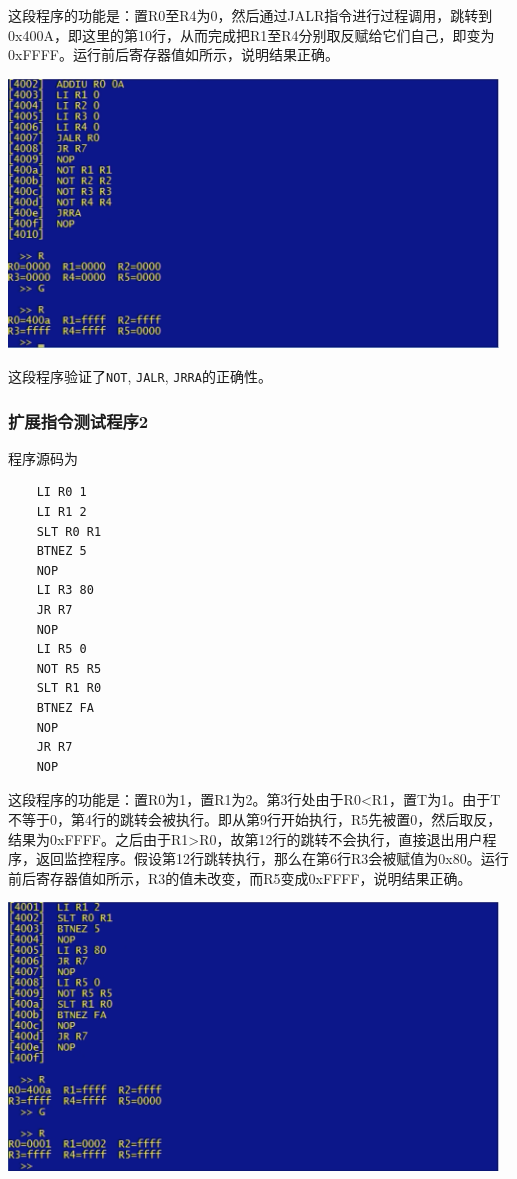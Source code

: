 这段程序的功能是：置R0至R4为0，然后通过JALR指令进行过程调用，跳转到0x400A，即这里的第10行，从而完成把R1至R4分别取反赋给它们自己，即变为0xFFFF。运行前后寄存器值如所示，说明结果正确。

\begin{center}
    \includegraphics[width=13cm]{image/testing/p1}
    \label{fig:testp1}
\end{center}

这段程序验证了\texttt{NOT}, \texttt{JALR}, \texttt{JRRA}的正确性。

\subsubsection{扩展指令测试程序2}

程序源码为

\begin{lstlisting}
    LI R0 1
    LI R1 2
    SLT R0 R1
    BTNEZ 5
    NOP
    LI R3 80
    JR R7
    NOP
    LI R5 0
    NOT R5 R5
    SLT R1 R0
    BTNEZ FA
    NOP
    JR R7
    NOP
\end{lstlisting}

这段程序的功能是：置R0为1，置R1为2。第3行处由于R0<R1，置T为1。由于T不等于0，第4行的跳转会被执行。即从第9行开始执行，R5先被置0，然后取反，结果为0xFFFF。之后由于R1>R0，故第12行的跳转不会执行，直接退出用户程序，返回监控程序。假设第12行跳转执行，那么在第6行R3会被赋值为0x80。运行前后寄存器值如所示，R3的值未改变，而R5变成0xFFFF，说明结果正确。

\begin{center}
    \includegraphics[width=13cm]{image/testing/p2}
    \label{fig:testp2}
\end{center}

